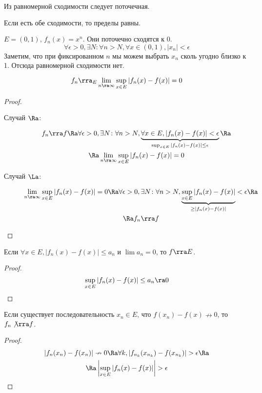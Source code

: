 \begin{Rem}
	Из равномерной сходимости следует поточечная.
\end{Rem}
\begin{Rem}
	Если есть обе сходимости, то пределы равны.
\end{Rem}

\begin{exmp}
	$E = (0, 1)$, $f_n(x) = x^n$.
	Они поточечно сходятся к $0$.
	\[ \forall \epsilon > 0, \exists N\colon \forall n > N, \forall x \in (0, 1), |x_n| < \epsilon \]
	Заметим, что при фиксированном $n$ мы можем выбрать $x_n$ сколь угодно близко к 1.
	Отсюда равномерной сходимости нет.
\end{exmp}

\begin{theorem}
	\[ f_n \rra_E \lim_{n\ra\infty} \sup_{x \in E} |f_n(x) - f(x)| = 0 \]
\end{theorem}
\begin{proof}
	\begin{description}
	\item[Случай $\Ra$:]
		\begin{gather*}
			f_n \rra f
			\Ra \forall \epsilon > 0, \exists N\colon \forall n > N, \underbrace{\forall x \in E, |f_n(x) - f(x)| < \epsilon}_{\sup_{x \in E} |f_n(x) - f(x)| \le \epsilon} \Ra \\
			\Ra \lim_{n\ra\infty} \sup_{x \in E} |f_n(x) - f(x)| = 0
		\end{gather*}

	\item[Случай $\La$:]
		\begin{gather*}
			\lim_{n\ra\infty} \sup_{x \in E} |f_n(x) - f(x)| = 0
			\Ra \forall \epsilon > 0, \exists N\colon \forall n > N, \underbrace{\sup_{x \in E} |f_n(x) - f(x)|}_{\ge |f_n(x) - f(x)|} < \epsilon \Ra \\
			\Ra f_n \rra f
		\end{gather*}
	\end{description}
\end{proof}

\begin{conseq}
	Если $\forall x \in E, |f_n(x) - f(x)| \le a_n$ и $\lim a_n = 0$, то $f \rra E$.
\end{conseq}
\begin{proof}
	\[ \sup_{x \in E} |f_n(x) - f(x)| \le a_n \ra 0 \]
\end{proof}

\begin{conseq}
	Если существует последовательность $x_n \in E$, что $f(x_n) - f(x) \nrightarrow 0$, то $f_n \not\rra f$.
\end{conseq}
\begin{proof}
	\begin{gather*}
		|f_n(x_n) - f(x_n)| \nrightarrow 0
		\Ra \forall k, |f_{n_k}(x_{n_k}) - f(x_{n_k})| > \epsilon \Ra \\
		\Ra \left| \sup_{x \in E} |f_n(x) - f(x)| \right| > \epsilon
	\end{gather*}
\end{proof}

